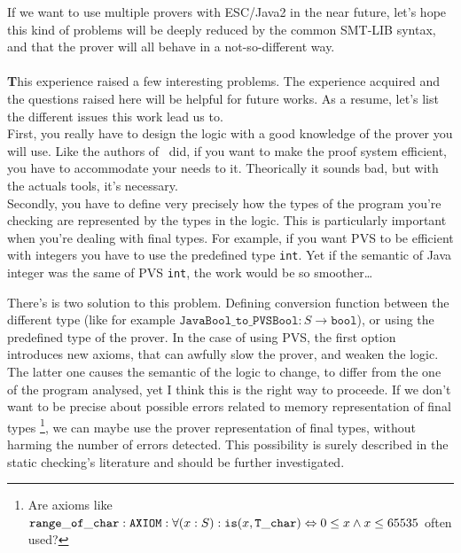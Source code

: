 \documentclass[english,a4paper,10pt]{article}
\newcommand{\superParachute}[1]{\paragraph{}\textbf{#1}}
\newcommand{\BalleSousLeLit}[2]{
\bigskip
\bigskip
\begin{Large}\textbf{\begin{LARGE}#1\end{LARGE}#2}\end{Large}
}
\begin{document}
If we want to use multiple provers with ESC/Java2 in the near future,
let's hope this kind of problems will be deeply reduced by the common
SMT-LIB syntax, and that the prover will all behave in a
not-so-different way.

\newpage

\BalleSousLeLit{C}{onclusion}

\superParachute{T}his experience raised a few interesting
problems. The experience acquired and the questions raised here will
be helpful for future works. As a resume, let's list the different
issues this work lead us to.\\
 
First, you really have to design the logic with a good knowledge of
the prover you will use. Like the authors of~\cite{1} did, if you want
to make the proof system efficient, you have to accommodate your needs
to it. Theorically it sounds bad, but with the actuals tools, it's
necessary.\\

Secondly, you have to define very precisely how the types of the
program you're checking are represented by the types in the
logic. This is particularly important when you're dealing with final
types. For example, if you want PVS to be efficient with integers you
have to use the predefined type \texttt{int}. Yet if the semantic of
Java integer was the same of PVS \texttt{int}, the work would be so
smoother\dots

There's is two solution to this problem. Defining conversion function
between the different type (like for example
$\mathtt{JavaBool\_to\_PVSBool} : S \rightarrow \mathtt{bool}$), or using
the predefined type of the prover. In the case of using PVS, the first
option introduces new axioms, that can awfully slow the prover, and
weaken the logic. The latter one causes the semantic of the logic to
change, to differ from the one of the program analysed, yet I think
this is the right way to proceede. If we don't want to be precise
about possible errors related to memory representation of final types
\footnote{Are axioms like
  $\mathtt{range\_of\_char} : \mathtt{AXIOM} :\\
  \forall (x : S): \mathtt{is}(x, \mathtt{T\_char}) \Leftrightarrow 0 \leq
  x \wedge x \leq 65535$ often used?}, we can maybe use the prover
representation of final types, without harming the number of errors
detected. This possibility is surely described in the static
checking's literature and should be further investigated.\\
\end{document}
